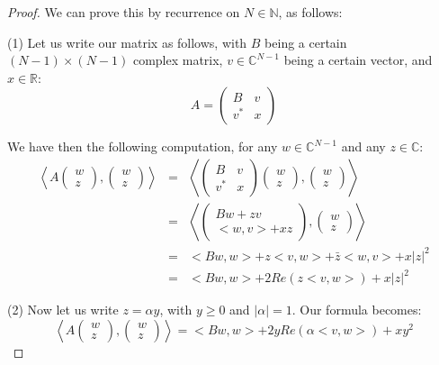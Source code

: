 \documentclass[12pt]{amsbook}
\begin{document}
\begin{proof}
We can prove this by recurrence on $N\in\mathbb N$, as follows:

\medskip

(1) Let us write our matrix as follows, with $B$ being a certain $(N-1)\times(N-1)$ complex matrix, $v\in\mathbb C^{N-1}$ being a certain vector, and $x\in\mathbb R$:
$$A=\begin{pmatrix}
B&v\\
v^*&x\end{pmatrix}$$

We have then the following computation, for any $w\in\mathbb C^{N-1}$ and any $z\in\mathbb C$:
\begin{eqnarray*}
\left<A\begin{pmatrix}w\\ z\end{pmatrix},\begin{pmatrix}w\\ z\end{pmatrix}\right>
&=&\left<\begin{pmatrix}
B&v\\
v^*&x\end{pmatrix}
\begin{pmatrix}w\\ z\end{pmatrix},\begin{pmatrix}w\\ z\end{pmatrix}\right>\\
&=&\left<\begin{pmatrix}
Bw+zv\\
<w,v>+xz\end{pmatrix},\begin{pmatrix}w\\ z\end{pmatrix}\right>\\
&=&<Bw,w>+z<v,w>+\bar{z}<w,v>+x|z|^2\\
&=&<Bw,w>+2Re(z<v,w>)+x|z|^2
\end{eqnarray*}

(2) Now let us write $z=\alpha y$, with $y\geq 0$ and $|\alpha|=1$. Our formula becomes:
$$\left<A\begin{pmatrix}w\\ z\end{pmatrix},\begin{pmatrix}w\\ z\end{pmatrix}\right>
=<Bw,w>+2yRe(\alpha<v,w>)+xy^2$$


\end{proof}
\end{document}
